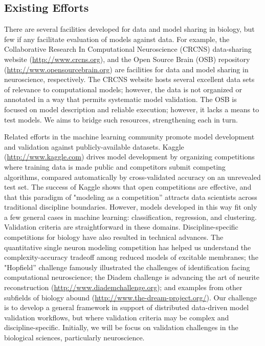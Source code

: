 \documentclass[11pt,letterpaper]{article}
\begin{document}
\subsection{Existing Efforts}\label{sec:existing_efforts}
There are several facilities developed for data and model sharing in biology, but few if any facilitate evaluation of models against data.  For example, the Collaborative Research In Computational Neuroscience (CRCNS) data-sharing website (\url{http://www.crcns.org}), and the Open Source Brain (OSB) repository (\url{http://www.opensourcebrain.org}) are facilities for data and model sharing in neuroscience, respectively.  The CRCNS website hosts several excellent data sets of relevance to computational models; however, the data is not organized or annotated in a way that permits systematic model validation.  The OSB is focused on model description and reliable execution; however, it lacks a means to test models. We aims to bridge such resources, strengthening each in turn.

Related efforts in the machine learning community promote model development and validation against publicly-available datasets.  Kaggle (\url{http://www.kaggle.com}) drives model development by organizing competitions where training data is made public and competitors submit competing algorithms, compared automatically by cross-validated accuracy on an unrevealed test set. The success of Kaggle \cite{carpenter_may_2011} shows that open competitions are effective, and that this paradigm of "modeling as a competition'' attracts data scientists across traditional discipline boundaries. However, models developed in this way fit only a few general cases in machine learning: classification, regression, and clustering. Validation criteria are straightforward in these domains. Discipline-specific competitions for biology have also resulted in technical advances.  The quantitative single neuron modeling competition \cite{jolivet_quantitative_2008} has helped us understand the complexity-accuracy tradeoff among reduced models of excitable membranes; the "Hopfield'' challenge \cite{hopfield_what_2000} famously illustrated the challenges of identification facing computational neuroscience; the Diadem challenge is advancing the art of neurite reconstruction (\url{http://www.diademchallenge.org}); and examples from other subfields of biology abound (\url{http://www.the-dream-project.org/}). Our challenge is to develop a general framework in support of distributed data-driven model validation workflows, but where validation criteria may be complex and discipline-specific. Initially, we will be focus on validation challenges in the biological sciences, particularly neuroscience. 
\end{document}
